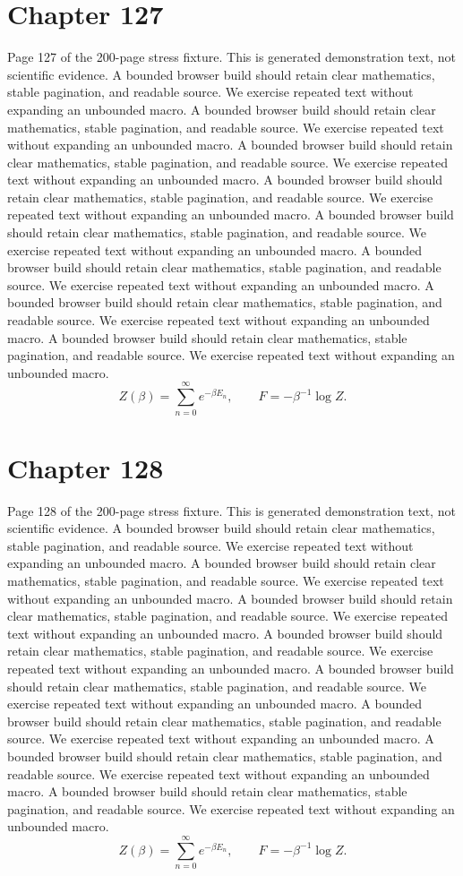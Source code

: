 \documentclass[11pt]{article}
\begin{document}
\section*{Chapter 127}
Page 127 of the 200-page stress fixture. This is generated demonstration text, not scientific evidence.
A bounded browser build should retain clear mathematics, stable pagination, and readable source. We exercise repeated text without expanding an unbounded macro.
A bounded browser build should retain clear mathematics, stable pagination, and readable source. We exercise repeated text without expanding an unbounded macro.
A bounded browser build should retain clear mathematics, stable pagination, and readable source. We exercise repeated text without expanding an unbounded macro.
A bounded browser build should retain clear mathematics, stable pagination, and readable source. We exercise repeated text without expanding an unbounded macro.
A bounded browser build should retain clear mathematics, stable pagination, and readable source. We exercise repeated text without expanding an unbounded macro.
A bounded browser build should retain clear mathematics, stable pagination, and readable source. We exercise repeated text without expanding an unbounded macro.
A bounded browser build should retain clear mathematics, stable pagination, and readable source. We exercise repeated text without expanding an unbounded macro.
A bounded browser build should retain clear mathematics, stable pagination, and readable source. We exercise repeated text without expanding an unbounded macro.
\[Z(\beta)=\sum_{n=0}^{\infty}e^{-\beta E_n},\qquad F=-\beta^{-1}\log Z.\]
\newpage
\section*{Chapter 128}
Page 128 of the 200-page stress fixture. This is generated demonstration text, not scientific evidence.
A bounded browser build should retain clear mathematics, stable pagination, and readable source. We exercise repeated text without expanding an unbounded macro.
A bounded browser build should retain clear mathematics, stable pagination, and readable source. We exercise repeated text without expanding an unbounded macro.
A bounded browser build should retain clear mathematics, stable pagination, and readable source. We exercise repeated text without expanding an unbounded macro.
A bounded browser build should retain clear mathematics, stable pagination, and readable source. We exercise repeated text without expanding an unbounded macro.
A bounded browser build should retain clear mathematics, stable pagination, and readable source. We exercise repeated text without expanding an unbounded macro.
A bounded browser build should retain clear mathematics, stable pagination, and readable source. We exercise repeated text without expanding an unbounded macro.
A bounded browser build should retain clear mathematics, stable pagination, and readable source. We exercise repeated text without expanding an unbounded macro.
A bounded browser build should retain clear mathematics, stable pagination, and readable source. We exercise repeated text without expanding an unbounded macro.
\[Z(\beta)=\sum_{n=0}^{\infty}e^{-\beta E_n},\qquad F=-\beta^{-1}\log Z.\]
\newpage
\end{document}
